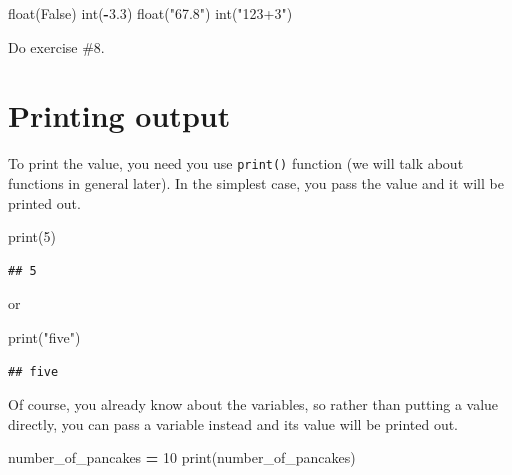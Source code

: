 \documentclass[
]{book}
\newenvironment{Shaded}{\begin{snugshade}}{\end{snugshade}}
\newcommand{\BuiltInTok}[1]{#1}
\newcommand{\DecValTok}[1]{\textcolor[rgb]{0.00,0.00,0.81}{#1}}
\newcommand{\FloatTok}[1]{\textcolor[rgb]{0.00,0.00,0.81}{#1}}
\newcommand{\NormalTok}[1]{#1}
\newcommand{\OperatorTok}[1]{\textcolor[rgb]{0.81,0.36,0.00}{\textbf{#1}}}
\newcommand{\StringTok}[1]{\textcolor[rgb]{0.31,0.60,0.02}{#1}}
\newcommand{\VariableTok}[1]{\textcolor[rgb]{0.00,0.00,0.00}{#1}}
\begin{document}
\begin{Shaded}
\begin{Highlighting}[]
\BuiltInTok{float}\NormalTok{(}\VariableTok{False}\NormalTok{)}
\BuiltInTok{int}\NormalTok{(}\OperatorTok{{-}}\FloatTok{3.3}\NormalTok{)}
\BuiltInTok{float}\NormalTok{(}\StringTok{"67.8"}\NormalTok{)}
\BuiltInTok{int}\NormalTok{(}\StringTok{"123+3"}\NormalTok{)}
\end{Highlighting}
\end{Shaded}

Do exercise \#8.

\hypertarget{printing-output}{%
\section{Printing output}\label{printing-output}}

To print the value, you need you use \texttt{print()} function (we will talk about functions in general later). In the simplest case, you pass the value and it will be printed out.

\begin{Shaded}
\begin{Highlighting}[]
\BuiltInTok{print}\NormalTok{(}\DecValTok{5}\NormalTok{)}
\end{Highlighting}
\end{Shaded}

\begin{verbatim}
## 5
\end{verbatim}

or

\begin{Shaded}
\begin{Highlighting}[]
\BuiltInTok{print}\NormalTok{(}\StringTok{"five"}\NormalTok{)}
\end{Highlighting}
\end{Shaded}

\begin{verbatim}
## five
\end{verbatim}

Of course, you already know about the variables, so rather than putting a value directly, you can pass a variable instead and its value will be printed out.

\begin{Shaded}
\begin{Highlighting}[]
\NormalTok{number\_of\_pancakes }\OperatorTok{=} \DecValTok{10}
\BuiltInTok{print}\NormalTok{(number\_of\_pancakes)}
\end{Highlighting}
\end{Shaded}
\end{document}
